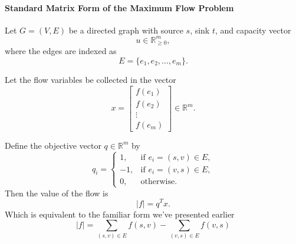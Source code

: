 \paragraph{Standard Matrix Form of the Maximum Flow Problem}

Let \(G=(V,E)\) be a directed graph with source \(s\), sink \(t\), and capacity vector
\[
u \in \mathbb{R}^m_{\ge 0},
\]
where the edges are indexed as
\[
E=\{e_1,e_2,\dots,e_m\}.
\]

Let the flow variables be collected in the vector
\[
x=\begin{bmatrix}
f(e_1)\\
f(e_2)\\
\vdots\\
f(e_m)
\end{bmatrix}\in\mathbb{R}^m.
\]

Define the objective vector \(q \in \mathbb{R}^m\) by
\[
q_i =
\begin{cases}
1, & \text{if } e_i=(s,v)\in E, \\[4pt]
-1, & \text{if } e_i=(v,s)\in E, \\[4pt]
0, & \text{otherwise.}
\end{cases}
\]
Then the value of the flow is
\[
|f| = q^T x.
\]
Which is equivalent to the familiar form we've presented earlier
\[
|f|
=
\sum_{(s,v)\in E} f(s,v)
-
\sum_{(v,s)\in E} f(v,s)
\]

